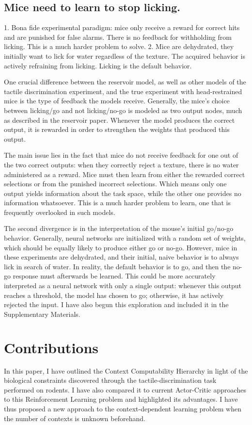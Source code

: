 \documentclass[]{article}
\begin{document}
\subsection{Mice need to learn to stop licking.}
1. Bona fide experimental paradigm: mice only receive a reward for correct hits and are punished for false alarms.  There is no feedback for withholding from licking.  This is a much harder problem to solve.
2. Mice are dehydrated, they initially want to lick for water regardless of the texture.  The acquired behavior is actively refraining from licking.  Licking is the default behavior.

One crucial difference between the reservoir model, as well as other models of the tactile discrimination experiment, and the true experiment with head-restrained mice is the type of feedback the models receive.  Generally, the mice's choice between licking/go and not licking/no-go is modeled as two output nodes, much as described in the reservoir paper.  Whenever the model produces the correct output, it is rewarded in order to strengthen the weights that produced this output.  

The main issue lies in the fact that mice do not receive feedback for one out of the two correct outputs: when they correctly reject a texture, there is no water administered as a reward.  Mice must then learn from either the rewarded correct selections or from the punished incorrect selections.  Which means only one output yields information about the task space, while the other one provides no information whatsoever.  This is a much harder problem to learn, one that is frequently overlooked in such models.

The second divergence is in the interpretation of the mouse's initial go/no-go behavior.  Generally, neural networks are initialized with a random set of weights, which should be equally likely to produce either go or no-go.  However, mice in these experiments are dehydrated, and their initial, naive behavior is to always lick in search of water.  In reality, the default behavior is to go, and then the no-go response must afterwards be learned.  This could be more accurately interpreted as a neural network with only a single output: whenever this output reaches a threshold, the model has chosen to go; otherwise, it has actively rejected the input.  I have also begun this exploration and included it in the Supplementary Materials.

\section{Contributions}
In this paper, I have outlined the Context Computability Hierarchy in light of the biological constraints discovered through the tactile-discrimination task performed on rodents.  I have also compared it to current Actor-Critic approaches to this Reinforcement Learning problem and highlighted its advantages.  I have thus proposed a new approach to the context-dependent learning problem when the number of contexts is unknown beforehand.
\end{document}
